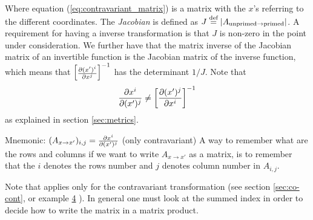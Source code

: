 \documentclass[a4paper, 12pt]{article}
\begin{document}
%
Where equation (\ref{eq:contravariant_matrix}) is a matrix with the $x$'s
referring to the different coordinates. The \emph{Jacobian} is
defined as $J\overset{\text{def}}{=}|A_{\text{unprimed}\to \text{primed}}|$. A requirement for
having a inverse transformation is that $J$ is non-zero in the point under
consideration. We further have that the matrix inverse of the Jacobian matrix
of an invertible function is the Jacobian matrix of the inverse function, which
means that
%
$\begin{bmatrix}
 \frac{\partial {(x')^i}}{\partial{x^j}}
\end{bmatrix}^{-1}$
has the determinant $1/J$. Note that
%
\begin{align*}
 \frac{\partial {x^i}}{\partial{(x')^j}} \neq \left[\frac{\partial {(x')^j}}{\partial{x^i}}\right]^{-1}
\end{align*}
%
as explained in section \ref{sec:metrics}.

\vspace{0.5cm}
\begin{greenbox}{Mnemonic: $(A_{x \to x'})_{i,j} = \frac{\partial {x^i}}{\partial{(x')^j}}$ (only
contravariant)}
 A way to remember what are the rows and columns if we want to write $A_{x \to
 x'}$ as a matrix, is to remember that the $i$ denotes the rows number and
 $j$ denotes column number in $A_{i,j}$.

 Note that applies only for the contravariant transformation (see section
\ref{sec:co-cont}, or example \hyperref[ex:fmt]{4} ). In general one must look
at the summed index in order to decide how to write the matrix in a matrix
product.
\end{greenbox}
\end{document}
